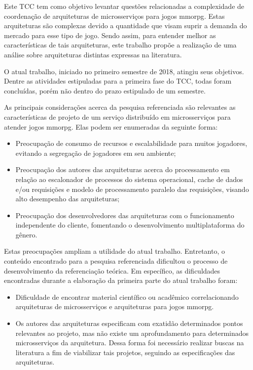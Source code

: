 Este TCC tem como objetivo levantar questões relacionadas a complexidade de coordenação de arquiteturas de microsserviços para jogos \ac{mmorpg}.
%
Estas arquiteturas são complexas devido a quantidade que visam suprir a demanda do mercado para esse tipo de jogo.
%
Sendo assim, para entender melhor as características de tais arquiteturas, este trabalho propõe a realização de uma análise sobre arquiteturas distintas expressas na literatura.


O atual trabalho, iniciado no primeiro semestre de 2018, atingiu seus objetivos.
%
Dentre as atividades estipuladas para a primeira fase do TCC, todas foram concluídas, porém não dentro do prazo estipulado de um semestre.

As principais considerações acerca da pesquisa referenciada são relevantes as características de projeto de um serviço distribuído em microsserviços para atender jogos \ac{mmorpg}.
%
Elas podem ser enumeradas da seguinte forma:

\begin{itemize}
  \item Preocupação de consumo de recursos e escalabilidade para muitos jogadores, evitando a segregação de jogadores em seu ambiente;
  \item Preocupação dos autores das arquiteturas acerca do processamento em relação ao escalonador de processos do sistema operacional, cache de dados e/ou requisições e modelo de processamento paralelo das requisições, visando alto desempenho das arquiteturas;
  \item Preocupação dos desenvolvedores das arquiteturas com o funcionamento independente do cliente, fomentando o desenvolvimento multiplataforma do gênero.
\end{itemize}

Estas preocupações ampliam a utilidade do atual trabalho.
%
Entretanto, o conteúdo encontrado para a pesquisa referenciada dificultou o processo de desenvolvimento da referenciação teórica.
%
Em específico, as dificuldades encontradas durante a elaboração da primeira parte do atual trabalho foram:

\begin{itemize}
  \item Dificuldade de encontrar material científico ou acadêmico correlacionando arquiteturas de microsserviços e arquiteturas para jogos \ac{mmorpg}.
  \item Os autores das arquiteturas especificam com exatidão determinados pontos relevantes ao projeto, mas não existe um aprofundamento para determinados microsserviços da arquitetura. Dessa forma foi necessário realizar buscas na literatura a fim de viabilizar tais projetos, seguindo as especificações das arquiteturas.
\end{itemize}

